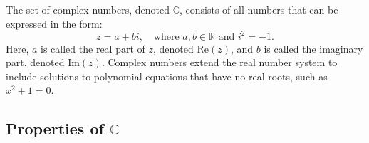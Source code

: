 The set of complex numbers, denoted \( \mathbb{C} \), consists of all numbers that can be expressed in the form:
\[
z = a + bi, \quad \text{where } a, b \in \mathbb{R} \text{ and } i^2 = -1.
\]
Here, \( a \) is called the real part of \( z \), denoted \( \text{Re}(z) \), and \( b \) is called the imaginary part, denoted \( \text{Im}(z) \). Complex numbers extend the real number system to include solutions to polynomial equations that have no real roots, such as \( x^2 + 1 = 0 \).

\subsection{Properties of \( \mathbb{C} \)}
